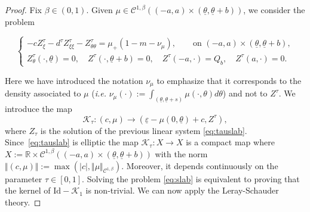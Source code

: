 \documentclass[11pt]{article}    %
\renewcommand{\epsilon}{\varepsilon}
\begin{document}
\begin{proof}%
Fix $\beta \in (0,1)$.  Given $\mu \in \mathcal{C}^{1,\beta}((-a,a) \times (\underline\theta, \underline\theta + b))$, we consider the problem%

\begin{equation}\label{eq:tauslab}
\begin{cases}
-c Z_\xi^\tau - d^\tau Z_{\xi\xi}^\tau - Z_{\theta\theta}^\tau =  \mu_+ (1 - m -  \nu_\mu),\qquad \text{on }  (-a,a) \times (\underline\theta, \underline\theta + b), \\
Z_\theta^\tau(\cdot,\underline \theta) = 0, \quad Z^\tau(\cdot, \underline \theta + b) = 0, \quad
Z^\tau(-a,\cdot) = Q_b, \quad Z^\tau(a,\cdot)  = 0.
\end{cases}
\end{equation}


Here we have introduced the notation $\nu_\mu$ to emphasize that it corresponds to the density associated to $\mu$ (\textit{i.e.} $\nu_\mu(\cdot) := \int_{(\underline\theta,\underline\theta + s)} \mu(\cdot,\theta) d\theta$) and not to $Z^\tau$.  We introduce the map 
\begin{equation*}
\mathcal{K}_{\tau}: (c,\mu) \to \left(\underline \epsilon - \mu(0,\underline \theta) + c , Z^{\tau} \right), 
\end{equation*}
where $Z_{\tau}$ is the solution of the previous linear system \eqref{eq:tauslab}. 
Since~\eqref{eq:tauslab} is elliptic the map $\mathcal{K}_{\tau}: X \to X$ is a compact map where $X := \mathbb{R} \times \mathcal{C}^{1,{\beta}} \left( (-a,a) \times (\underline\theta, \underline\theta + b)\right)$ with the norm $\Vert (c , \mu) \Vert := \max \left( \vert c \vert, \Vert \mu \Vert_{ \mathcal{C}^{1,\beta}} \right)$. Moreover, it depends continuously on the parameter $\tau \in \left[ 0 , 1 \right]$. Solving the problem %
\eqref{eq:slab} is equivalent to proving that the kernel of $\text{Id} - \mathcal{K}_1$ is non-trivial. We can now apply the Leray-Schauder theory. 


\end{proof}
\end{document}
